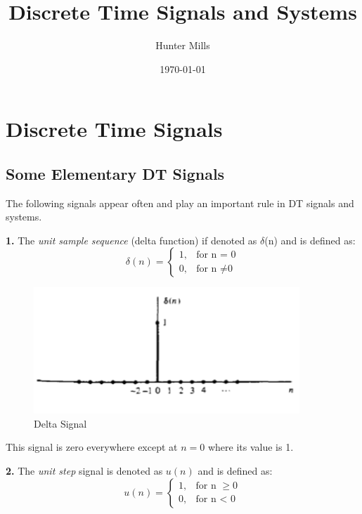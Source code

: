 \documentclass{article} %
\title{Discrete Time Signals and Systems} %
\author{Hunter Mills} %
\date{\today} %
\begin{document}
    \maketitle %
    
    \section{Discrete Time Signals} %
    
    \subsection{Some Elementary DT Signals}
    The following signals appear often and play an important rule in DT signals and systems.
    
    \textbf{1.} The \textit{unit sample sequence} (delta function) if denoted as $\delta$(n) and is defined as:
    \begin{equation}
 	 \delta (n) =
    	\begin{cases}
      	1, & \text{for n = 0}\\
      	0, & \text{for n } \neq \text{0}
    	\end{cases}       
	\end{equation}
    
    \begin{figure}[h]
    \centering
	\includegraphics[width=10cm]{delta}
	\caption{Delta Signal}
	\end{figure}
	This signal is zero everywhere except at $n = 0$ where its value is 1.
	
	\textbf{2.} The \textit{unit step} signal is denoted as $u(n)$ and is defined as:
	\begin{equation}
 	 u(n) =
    	\begin{cases}
      	1, & \text{for n } \ge { 0}\\
      	0, & \text{for n < 0}
    	\end{cases}       
	\end{equation}
    
\end{document}
